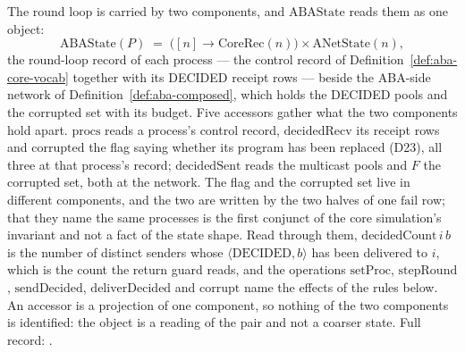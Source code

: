 \begin{definition}
  \label{def:aba-core}
  \leanok
  The round loop is carried by two components, and $\mathrm{ABAState}$ reads them as one object:
  \[
    \mathrm{ABAState}(P) \;=\;
      \bigl([n] \to \mathrm{CoreRec}(n)\bigr) \times \mathrm{ANetState}(n),
  \]
  the round-loop record of each process --- the control record of Definition~\ref{def:aba-core-vocab} together with its DECIDED receipt rows --- beside the ABA-side network of Definition~\ref{def:aba-composed}, which holds the DECIDED pools and the corrupted set with its budget.
  Five accessors gather what the two components hold apart.
  $\mathrm{procs}$ reads a process's control record, $\mathrm{decidedRecv}$ its receipt rows and $\mathrm{corrupted}$ the flag saying whether its program has been replaced (D23), all three at that process's record; $\mathrm{decidedSent}$ reads the multicast pools and $F$ the corrupted set, both at the network.
  The flag and the corrupted set live in different components, and the two are written by the two halves of one $\mathrm{fail}$ row; that they name the same processes is the first conjunct of the core simulation's invariant and not a fact of the state shape.
  Read through them, $\mathrm{decidedCount}\,i\,b$ is the number of distinct senders whose $\langle\mathrm{DECIDED},b\rangle$ has been delivered to $i$, which is the count the return guard reads, and the operations $\mathrm{setProc}$, $\mathrm{stepRound}$, $\mathrm{sendDecided}$, $\mathrm{deliverDecided}$ and $\mathrm{corrupt}$ name the effects of the rules below.
  An accessor is a projection of one component, so nothing of the two components is identified: the object is a reading of the pair and not a coarser state.
  Full record: .
\end{definition}
